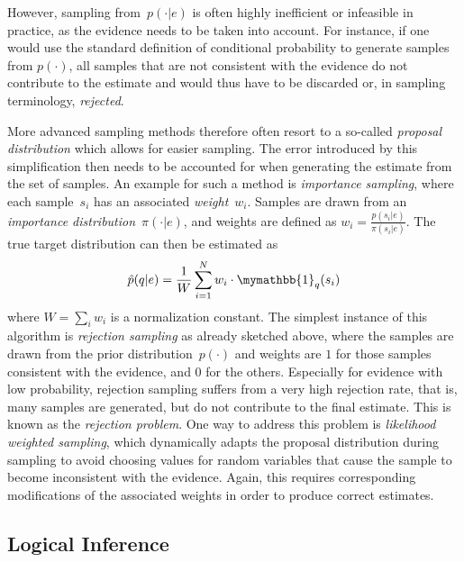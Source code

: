 \documentclass{tlp}
\begin{document}
However, sampling from~$p(\cdot|e)$ is often highly inefficient or
infeasible in practice, as the evidence needs to be taken into
account. For instance, if one would use the standard definition of
conditional probability to generate samples from $p(\cdot)$, all
samples that are not consistent with the evidence do not contribute to
the estimate and would thus have to be discarded or, in sampling
terminology, \emph{rejected}.

More advanced sampling methods therefore often resort to a so-called
\emph{proposal distribution} which allows for easier sampling. The
error introduced by this simplification then needs to be accounted for
when generating the estimate from the set of samples.  An example for
such a method is \emph{importance sampling}, where each sample~$s_i$
has an associated \emph{weight}~$w_i$. Samples are drawn from an
\emph{importance distribution}~$\pi(\cdot |e)$, and weights are
defined as $w_i=\frac{p(s_i|e)}{\pi(s_i|e)}$. The true target
distribution can then be estimated as
\begin{equation*}
  \hat{p}(q|e) = \frac{1}{W} \sum_{i=1}^Nw_i\cdot \mymathbb{1}_q(s_i)  
\end{equation*}
where $W=\sum_i w_i$ is a normalization constant. The simplest
instance of this algorithm is \emph{rejection sampling} as already
sketched above, where the samples are drawn from the prior
distribution~$p(\cdot)$ and weights are $1$ for those samples
consistent with the evidence, and $0$ for the others. Especially for
evidence with low probability, rejection sampling suffers from a very
high rejection rate, that is, many samples are generated, but do not
contribute to the final estimate. This is known as the \emph{rejection
  problem}. One way to address this problem is \emph{likelihood
  weighted sampling}, which dynamically adapts the proposal
distribution during sampling to avoid choosing values for random
variables that cause the sample to become inconsistent with the
evidence. Again, this requires corresponding modifications of the
associated weights in order to produce correct estimates.

\subsection{Logical Inference} 
\label{sec:forward}
\end{document}
